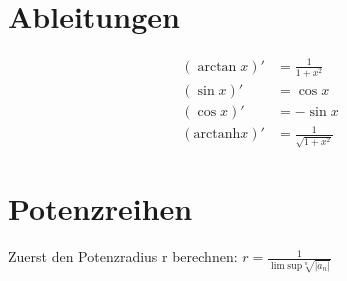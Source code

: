 \documentclass[a4paper,10pt]{article}
\begin{document}
\section{Ableitungen}
\begin{align*}
	(\arctan x)' &= \frac {1}{1 + x^2} \\
	(\sin x)'    &= \cos x \\
	(\cos x)'    &= -\sin x \\
	(\text{arctanh} x)' &= \frac {1}{\sqrt {1 + x^2}}
\end{align*}


\section{Potenzreihen}
Zuerst den Potenzradius r berechnen:
\(
	r = \frac {1}{\lim \text{sup} \sqrt[n]{|a_n|}}
\)
\end{document}
